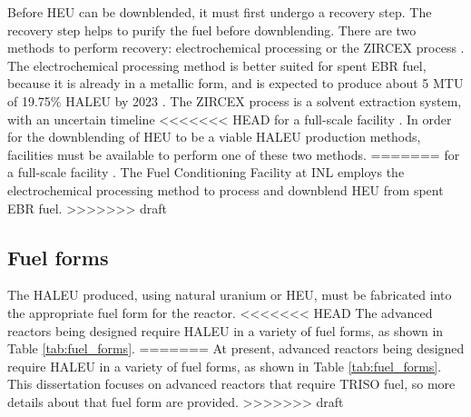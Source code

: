 Before \gls{HEU} can be downblended, it must first undergo a recovery step. 
The recovery step helps to purify the fuel before downblending. There 
are two methods to perform recovery: electrochemical processing or 
the ZIRCEX process \cite{herczeg_high-assay_2019}. The electrochemical 
processing method is better suited for spent \gls{EBR} fuel, because it is 
already in a metallic form, and is expected to produce about 5 MTU of 
19.75\% \gls{HALEU} by 2023 \cite{herczeg_high-assay_2019}. The ZIRCEX 
process is a solvent extraction system, with an uncertain timeline 
<<<<<<< HEAD
for a full-scale facility \cite{herczeg_high-assay_2019}. In order for
the downblending of \gls{HEU} to be a viable \gls{HALEU} production 
methods, facilities must be available to perform one of these two methods. 
=======
for a full-scale facility \cite{herczeg_high-assay_2019}. The 
Fuel Conditioning Facility at \gls{INL} employs the electrochemical 
processing method to process and downblend \gls{HEU} from spent 
\gls{EBR} fuel. 
>>>>>>> draft

\subsection{Fuel forms}
The \gls{HALEU} produced, using natural uranium or \gls{HEU}, must be 
fabricated into the appropriate fuel form for the reactor.
<<<<<<< HEAD
The advanced reactors being designed require \gls{HALEU} in a 
variety of fuel forms, as shown in Table \ref{tab:fuel_forms}.  
=======
At present, advanced reactors being designed require \gls{HALEU} in a 
variety of fuel forms, as shown in Table \ref{tab:fuel_forms}. This 
dissertation focuses on advanced reactors that require 
\gls{TRISO} fuel, so more details about that fuel form are 
provided. 
>>>>>>> draft

